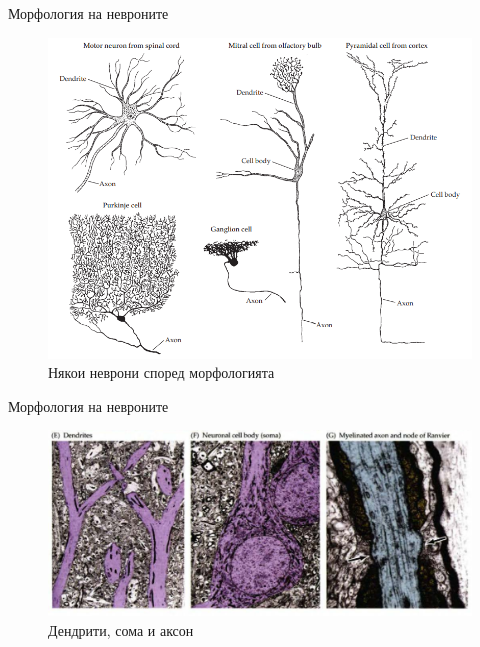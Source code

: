 \begin{frame}[t]{Морфология на невроните}
  \begin{figure}[htbp!]
    \centering
    \includegraphics[width=\textwidth,height=0.7\textheight,keepaspectratio]{neuron-types-2.PNG}
    \caption{Някои неврони според морфологията \cite[Фиг 1.4]{Neuron}}
  \end{figure}
\end{frame}

\begin{frame}[t]{Морфология на невроните}
  \begin{figure}[htbp!]
    \centering
    \includegraphics[width=\textwidth,height=\textheight,keepaspectratio]{neuron-parts.PNG}
    \caption{Дендрити, сома и аксон \cite[Фиг 1.3]{Neuroscience}}
    \label{figure:usf}
  \end{figure}
\end{frame}

